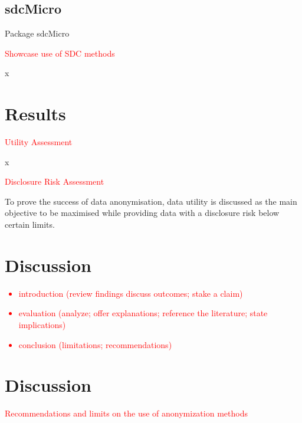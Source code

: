 \documentclass{article}
\begin{document}
\subsection{sdcMicro}

Package sdcMicro~\cite{2024_Sdcmicro}

\textcolor{red}{Showcase use of SDC methods}

x

\section{Results}

\textcolor{red}{Utility Assessment}

x

\textcolor{red}{Disclosure Risk Assessment}

To prove the success of data anonymisation, data utility is discussed as the main objective to be maximised while providing data with a disclosure risk below certain limits.

\section{Discussion}

\textcolor{red}{
\begin{itemize}
    \item introduction (review findings discuss outcomes; stake a claim)
    \item evaluation (analyze; offer explanations; reference the literature; state implications)    
    \item conclusion (limitations; recommendations)
\end{itemize}
} %

\section{Discussion}

\textcolor{red}{Recommendations and limits on the use of anonymization methods}
   
\end{document}
